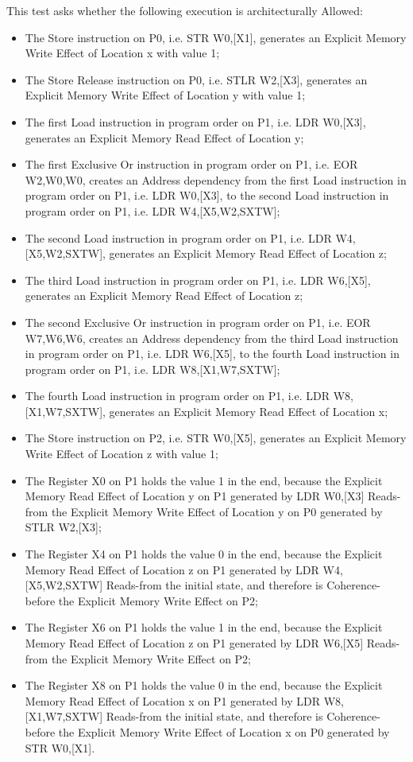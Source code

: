 This test asks whether the following execution is architecturally Allowed:

\begin{itemize}
  \item The Store instruction on P0, i.e. STR W0,[X1], generates an Explicit Memory Write Effect of Location x with value 1;
  \item The Store Release instruction on P0, i.e. STLR W2,[X3], generates an Explicit Memory Write Effect of Location y with value 1;
  \item The first Load instruction in program order on P1, i.e. LDR W0,[X3], generates an Explicit Memory Read Effect of Location y;
  \item The first Exclusive Or instruction in program order on P1, i.e. EOR W2,W0,W0, creates an Address dependency from the first Load instruction in program order on P1, i.e. LDR W0,[X3], to the second Load instruction in program order on P1, i.e. LDR W4,[X5,W2,SXTW];
  \item The second Load instruction in program order on P1, i.e. LDR W4,[X5,W2,SXTW], generates an Explicit Memory Read Effect of Location z;
  \item The third Load instruction in program order on P1, i.e. LDR W6,[X5], generates an Explicit Memory Read Effect of Location z;
  \item The second Exclusive Or instruction in program order on P1, i.e. EOR W7,W6,W6, creates an Address dependency from the third Load instruction in program order on P1, i.e. LDR W6,[X5], to the fourth Load instruction in program order on P1, i.e. LDR W8,[X1,W7,SXTW];
  \item The fourth Load instruction in program order on P1, i.e. LDR W8,[X1,W7,SXTW], generates an Explicit Memory Read Effect of Location x;
  \item The Store instruction on P2, i.e. STR W0,[X5], generates an Explicit Memory Write Effect of Location z with value 1;
  \item The Register X0 on P1 holds the value 1 in the end, because the Explicit Memory Read Effect of Location y on P1 generated by LDR W0,[X3] Reads-from the Explicit Memory Write Effect of Location y on P0 generated by STLR W2,[X3];
  \item The Register X4 on P1 holds the value 0 in the end, because the Explicit Memory Read Effect of Location z on P1 generated by LDR W4,[X5,W2,SXTW] Reads-from the initial state, and therefore is Coherence-before the Explicit Memory Write Effect on P2;
  \item The Register X6 on P1 holds the value 1 in the end, because the Explicit Memory Read Effect of Location z on P1 generated by LDR W6,[X5] Reads-from the Explicit Memory Write Effect on P2;
  \item The Register X8 on P1 holds the value 0 in the end, because the Explicit Memory Read Effect of Location x on P1 generated by LDR W8,[X1,W7,SXTW] Reads-from the initial state, and therefore is Coherence-before the Explicit Memory Write Effect of Location x on P0 generated by STR W0,[X1].
\end{itemize}

